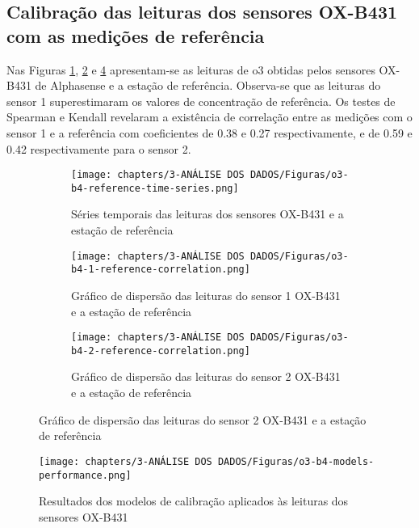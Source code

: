 \subsection{Calibração das leituras dos sensores OX-B431 com as medições de referência}

Nas Figuras \ref{fig:data-o3-reference-time-series}, \ref{fig:data-o3-1-reference-corr} e \ref{fig:data-o3-2-reference-corr} apresentam-se as leituras de \acrshort{o3} obtidas pelos sensores OX-B431 de Alphasense e a estação de referência. Observa-se que as leituras do sensor 1 superestimaram os valores de concentração de referência. Os testes de Spearman e Kendall revelaram a existência de correlação entre as medições com o sensor 1 e a referência com coeficientes de 0.38 e 0.27 respectivamente, e de 0.59 e 0.42 respectivamente para o sensor 2.

\begin{figure}[h]
    \centering
    \caption{Séries temporais e gráficos de dispersão das medições de \acrshort{o3}}
    \begin{subfigure}{0.4\textwidth}
        \texttt{[image: chapters/3-ANÁLISE DOS DADOS/Figuras/o3-b4-reference-time-series.png]}
        \caption{Séries temporais das leituras dos sensores OX-B431 e a estação de referência}
        \label{fig:data-o3-reference-time-series}
    \end{subfigure}
    \hfill
    \begin{subfigure}{0.5\textwidth}
        \texttt{[image: chapters/3-ANÁLISE DOS DADOS/Figuras/o3-b4-1-reference-correlation.png]}
        \caption{Gráfico de dispersão das leituras do sensor 1 OX-B431 e a estação de referência}
        \label{fig:data-o3-1-reference-corr}
    \end{subfigure}
    \hfill
    \begin{subfigure}{0.5\textwidth}
        \texttt{[image: chapters/3-ANÁLISE DOS DADOS/Figuras/o3-b4-2-reference-correlation.png]}
        \caption{Gráfico de dispersão das leituras do sensor 2 OX-B431 e a estação de referência}
        \label{fig:data-o3-2-reference-corr}
    \end{subfigure}
\end{figure}

\begin{figure}[h!]
    \centering
    \caption{Resultados dos modelos de calibração aplicados às leituras dos sensores OX-B431}
    \texttt{[image: chapters/3-ANÁLISE DOS DADOS/Figuras/o3-b4-models-performance.png]}
    \label{fig:data-o3-b4-models-performance}
\end{figure}

